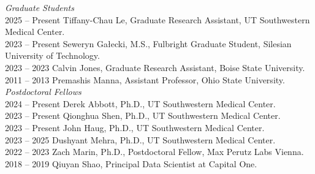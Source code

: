 \textit{Graduate Students} \\
2025 -- Present \hspace{14pt} Tiffany-Chau Le, Graduate Research Assistant, UT Southwestern Medical Center. \\
2023 -- Present \hspace{14pt} Seweryn Gałecki, M.S., Fulbright Graduate Student, Silesian University of Technology. \\
2023 -- 2023 \hspace{28pt} Calvin Jones, Graduate Research Assistant, Boise State University. \\
2011 -- 2013 \hspace{28pt} Premashis Manna, Assistant Professor, Ohio State University. \\

\textit{Postdoctoral Fellows} \\
2024 -- Present \hspace{14pt} Derek Abbott, Ph.D., UT Southwestern Medical Center. \\
2023 -- Present \hspace{14pt} Qionghua Shen, Ph.D., UT Southwestern Medical Center. \\
2023 -- Present \hspace{14pt} John Haug, Ph.D., UT Southwestern Medical Center. \\
2023 -- 2025 \hspace{28pt} Dushyant Mehra, Ph.D., UT Southwestern Medical Center. \\
2022 -- 2023 \hspace{28pt} Zach Marin, Ph.D., Postdoctoral Fellow, Max Perutz Labs Vienna. \\
2018 -- 2019 \hspace{28pt} Qiuyan Shao, Principal Data Scientist at Capital One. \\

